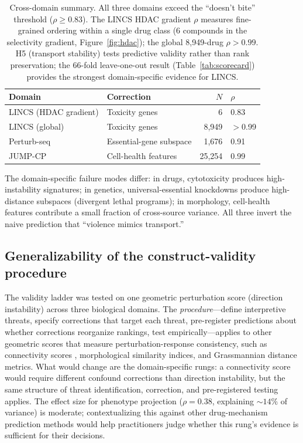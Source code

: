 \documentclass[11pt]{article}
\begin{document}
\begin{table}[t]
\centering
\caption{Cross-domain summary. All three domains exceed the ``doesn't
bite'' threshold ($\rho \geq 0.83$). The LINCS HDAC gradient $\rho$
measures fine-grained ordering within a single drug class (6 compounds
in the selectivity gradient, Figure~\ref{fig:hdac});
the global 8{,}949-drug $\rho > 0.99$. H5 (transport stability) tests
predictive validity rather than rank preservation; the 66-fold
leave-one-out result (Table~\ref{tab:scorecard}) provides the strongest
domain-specific evidence for LINCS.}
\label{tab:cross_domain}
\small
\begin{tabular}{llrl}
\toprule
Domain & Correction & $N$ & $\rho$ \\
\midrule
LINCS (HDAC gradient) & Toxicity genes & 6 & 0.83 \\
LINCS (global) & Toxicity genes & 8{,}949 & $>$0.99 \\
Perturb-seq & Essential-gene subspace & 1{,}676 & 0.91 \\
JUMP-CP & Cell-health features & 25{,}254 & 0.99 \\
\bottomrule
\end{tabular}
\end{table}

The domain-specific failure modes differ: in drugs, cytotoxicity
produces high-instability signatures; in genetics, universal-essential
knockdowns produce high-distance subspaces (divergent lethal programs);
in morphology, cell-health features contribute a small fraction of
cross-source variance. All three invert the naive prediction that
``violence mimics transport.''

\subsection{Generalizability of the construct-validity procedure}

The validity ladder was tested on one geometric perturbation score
(direction instability) across three biological domains. The
\emph{procedure}---define interpretive threats, specify corrections
that target each threat, pre-register predictions about whether
corrections reorganize rankings, test empirically---applies to other
geometric scores that measure perturbation-response consistency, such as
connectivity scores \citep{subramanian2017next}, morphological similarity
indices, and Grassmannian distance metrics. What would change are the
domain-specific rungs: a connectivity score would require different
confound corrections than direction instability, but the same
structure of threat identification, correction, and pre-registered
testing applies. The effect size for phenotype projection ($\rho = 0.38$,
explaining ${\sim}14\%$ of variance) is moderate; contextualizing this
against other drug-mechanism prediction methods would help
practitioners judge whether this rung's evidence is sufficient for
their decisions.
\end{document}
